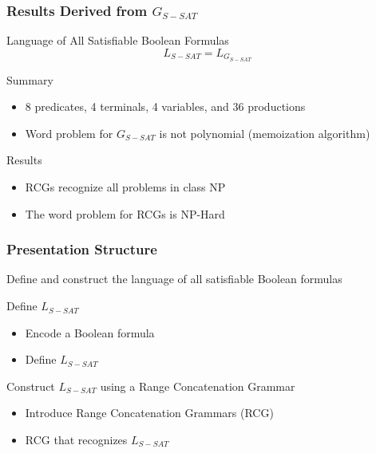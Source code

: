 \documentclass{beamer}
\begin{document}
\begin{frame}
    \frametitle{Results Derived from $G_{S-SAT}$}

    \begin{block}{Language of All Satisfiable Boolean Formulas}
        $$L_{S-SAT} = L_{G_{S-SAT}}$$
    \end{block}
    \pause
    \begin{block}{Summary}
        \begin{itemize}
            \item 8 predicates, 4 terminals, 4 variables, and 36 productions
                  \pause
            \item Word problem for $G_{S-SAT}$ is not polynomial (memoization algorithm)
        \end{itemize}
    \end{block}
    \pause
    \begin{block}{Results}
        \begin{itemize}
            \item RCGs recognize all problems in class NP
                  \pause
            \item The word problem for RCGs is NP-Hard
        \end{itemize}
    \end{block}
\end{frame}

\begin{frame}
    \frametitle{Presentation Structure}

    Define and construct the language of all satisfiable Boolean formulas


    \begin{block}{Define $L_{S-SAT}$}
        \begin{itemize}
            \item Encode a Boolean formula
            \item Define $L_{S-SAT}$
        \end{itemize}
    \end{block}

    \begin{block}{Construct $L_{S-SAT}$ using a Range Concatenation Grammar}
        \begin{itemize}
            \item Introduce Range Concatenation Grammars (RCG)
            \item RCG that recognizes $L_{S-SAT}$
        \end{itemize}
    \end{block}
\end{frame}
\end{document}
